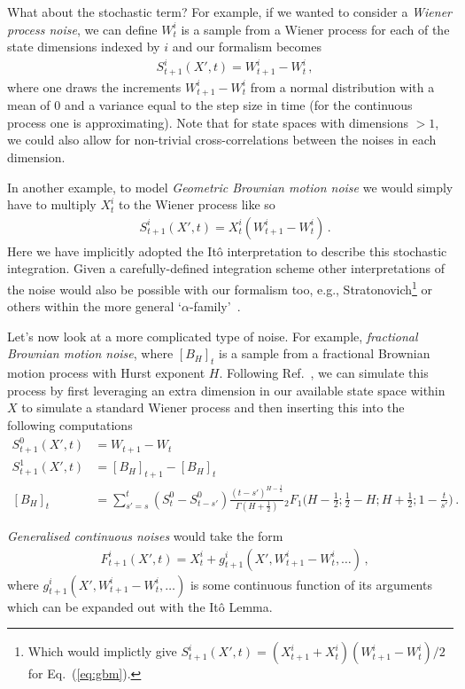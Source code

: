 \documentclass{book}
\begin{document}
What about the stochastic term? For example, if we wanted to consider a \emph{Wiener process noise}, we can define $W^i_{t}$ is a sample from a Wiener process for each of the state dimensions indexed by $i$ and our formalism becomes
\begin{align}
& S^{i}_{t+1}(X',t) =  W^i_{t+1}-W^i_{t} \label{eq:wiener}\,,
\end{align}
where one draws the increments $W^i_{t+1}-W^i_{t}$ from a normal distribution with a mean of $0$ and a variance equal to the step size in time (for the continuous process one is approximating). Note that for state spaces with dimensions $>1$, we could also allow for non-trivial cross-correlations between the noises in each dimension.

In another example, to model \emph{Geometric Brownian motion noise} we would simply have to multiply $X^i_t$ to the Wiener process like so
\begin{align}
& S^{i}_{t+1}(X',t) = X^i_{t}(W^i_{t+1}-W^i_{t})\label{eq:gbm} \,.
\end{align}
Here we have implicitly adopted the Itô interpretation to describe this stochastic integration. Given a carefully-defined integration scheme other interpretations of the noise would also be possible with our formalism too, e.g., Stratonovich\footnote{Which would implictly give $S^{i}_{t+1}(X',t) = (X^i_{t+1}+X^i_{t})(W^i_{t+1}-W^i_{t}) / 2$ for Eq.~(\ref{eq:gbm}).} or others within the more general `$\alpha$-family'~\cite{van1992stochastic,risken1996fokker,rog-will-2000}.

Let's now look at a more complicated type of noise. For example, \emph{fractional Brownian motion noise}, where $[B_{H}]_{t}$ is a sample from a fractional Brownian motion process with Hurst exponent $H$. Following Ref.~\cite{decreusefond1999stochastic}, we can simulate this process by first leveraging an extra dimension in our available state space within $X$ to simulate a standard Wiener process and then inserting this into the following computations
\begin{align}
S^{0}_{t+1}(X',t) &= W_{t+1} - W_{t} \\
S^{1}_{t+1}(X',t) &= [B_{H}]_{t+1}-[B_{H}]_{t} \\
[B_{H}]_{t} &= \sum^t_{s'=s} (S^{0}_{t} - S^{0}_{t-s'}) \frac{(t-s')^{H-\frac{1}{2}}}{\Gamma (H+\frac{1}{2})} {}_2F_1 \bigg( H-\frac{1}{2};\frac{1}{2}-H;H+\frac{1}{2};1-\frac{t}{s'}\bigg) \,.
\end{align}

\emph{Generalised continuous noises} would take the form
\begin{align}
& F^{i}_{t+1}(X',t) = X^i_{t} + g^i_{t+1}(X', W^i_{t+1}-W^i_t, \dots) \,,
\end{align}
where $g^i_{t+1}(X', W^i_{t+1}-W^i_t, \dots)$ is some continuous function of its arguments which can be expanded out with the Itô Lemma.
\end{document}
